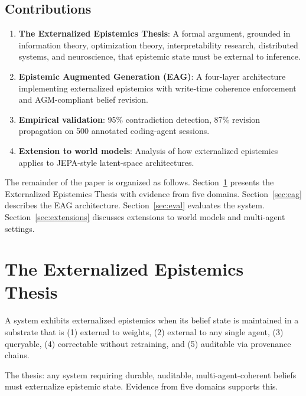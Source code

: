 \documentclass[11pt,letterpaper]{article}
\begin{document}
\subsection{Contributions}

\begin{enumerate}[noitemsep]
    \item \textbf{The Externalized Epistemics Thesis}: A formal argument, grounded in information theory, optimization theory, interpretability research, distributed systems, and neuroscience, that epistemic state must be external to inference.

    \item \textbf{Epistemic Augmented Generation (EAG)}: A four-layer architecture implementing externalized epistemics with write-time coherence enforcement and AGM-compliant belief revision.

    \item \textbf{Empirical validation}: 95\% contradiction detection, 87\% revision propagation on 500 annotated coding-agent sessions.

    \item \textbf{Extension to world models}: Analysis of how externalized epistemics applies to JEPA-style latent-space architectures.
\end{enumerate}

The remainder of the paper is organized as follows. Section~\ref{sec:thesis} presents the Externalized Epistemics Thesis with evidence from five domains. Section~\ref{sec:eag} describes the EAG architecture. Section~\ref{sec:eval} evaluates the system. Section~\ref{sec:extensions} discusses extensions to world models and multi-agent settings.

\section{The Externalized Epistemics Thesis}
\label{sec:thesis}

A system exhibits externalized epistemics when its belief state is maintained in a substrate that is (1) external to weights, (2) external to any single agent, (3) queryable, (4) correctable without retraining, and (5) auditable via provenance chains.

The thesis: any system requiring durable, auditable, multi-agent-coherent beliefs must externalize epistemic state. Evidence from five domains supports this.
\end{document}
